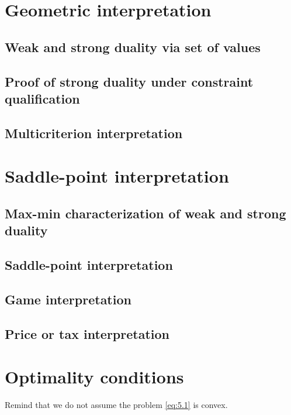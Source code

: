 \section{Geometric interpretation}
\subsection{Weak and strong duality via set of values}
\subsection{Proof of strong duality under constraint qualification}
\subsection{Multicriterion interpretation}

\section{Saddle-point interpretation}
\subsection{Max-min characterization of weak and strong duality}
\subsection{Saddle-point interpretation}
\subsection{Game interpretation}
\subsection{Price or tax interpretation}

\section{Optimality conditions}
Remind that we do not assume the problem \eqref{eq:5.1} is convex.


